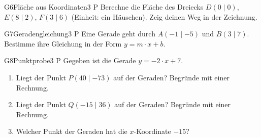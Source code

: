 \documentclass[11pt]{article}
\begin{document}
\begin{lpaufgabe}{G6}{Fläche aus Koordinaten}{3 P}
Berechne die Fläche des Dreiecks $D(0 \mid 0)$, $E(8 \mid 2)$, $F(3 \mid 6)$ (Einheit: ein Häuschen). Zeig deinen Weg in der Zeichnung.
\begin{center}
\end{center}
\end{lpaufgabe}


\begin{lpaufgabe}{G7}{Geradengleichung}{3 P}
Eine Gerade geht durch $A(-1 \mid -5)$ und $B(3 \mid 7)$. Bestimme ihre Gleichung in der Form $y = m \cdot x + b$.
\end{lpaufgabe}

\begin{lpaufgabe}{G8}{Punktprobe}{3 P}
Gegeben ist die Gerade $y = -2 \cdot x + 7$.
\begin{enumerate}[label=(\alph*),leftmargin=*,itemsep=3pt]
\item Liegt der Punkt $P(40 \mid -73)$ auf der Geraden? Begründe mit einer Rechnung.
\item Liegt der Punkt $Q(-15 \mid 36)$ auf der Geraden? Begründe mit einer Rechnung.
\item Welcher Punkt der Geraden hat die $x$-Koordinate $-15$?
\end{enumerate}
\end{lpaufgabe}
\end{document}
